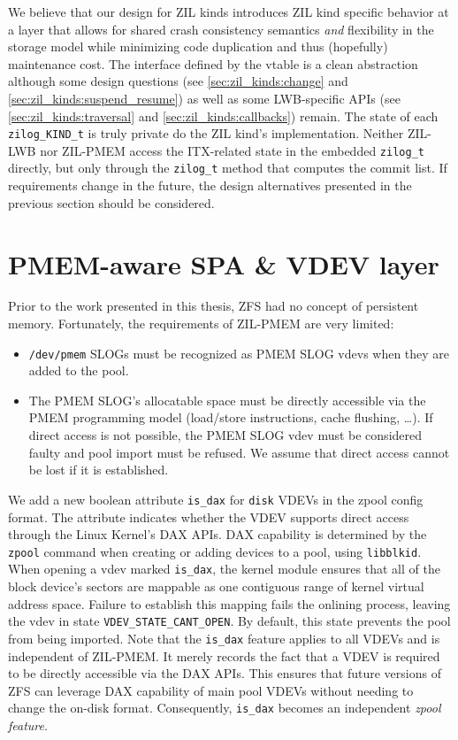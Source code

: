 \documentclass[12pt,a4paper,twoside]{book}
\begin{document}
We believe that our design for ZIL kinds introduces ZIL kind specific behavior at a layer that allows for shared crash consistency semantics \textit{and} flexibility in the storage model while minimizing code duplication and thus (hopefully) maintenance cost.
The interface defined by the vtable is a clean abstraction although some design questions (see \ref{sec:zil_kinds:change} and \ref{sec:zil_kinds:suspend_resume}) as well as some LWB-specific APIs (see \ref{sec:zil_kinds:traversal} and \ref{sec:zil_kinds:callbacks}) remain.
The state of each \lstinline{zilog_KIND_t} is truly private do the ZIL kind's implementation.
Neither ZIL-LWB nor ZIL-PMEM access the ITX-related state in the embedded \lstinline{zilog_t} directly, but only through the \lstinline{zilog_t} method that computes the commit list.
If requirements change in the future, the design alternatives presented in the previous section should be considered.

\section{PMEM-aware SPA \& VDEV layer}\label{sec:pmemspavdev}
Prior to the work presented in this thesis, ZFS had no concept of persistent memory.
Fortunately, the requirements of ZIL-PMEM are very limited:
\begin{itemize}[noitemsep]
    \item \texttt{/dev/pmem} SLOGs must be recognized as PMEM SLOG vdevs when they are added to the pool.
    \item The PMEM SLOG's allocatable space must be directly accessible via the PMEM programming model (load/store instructions, cache flushing, \dots).
        If direct access is not possible, the PMEM SLOG vdev must be considered faulty and pool import must be refused.
        We assume that direct access cannot be lost if it is established.
\end{itemize}

We add a new boolean attribute \lstinline{is_dax} for \lstinline{disk} VDEVs in the zpool config format.
The attribute indicates whether the VDEV supports direct access through the Linux Kernel's DAX APIs.
DAX capability is determined by the \lstinline{zpool} command when creating or adding devices to a pool, using \lstinline{libblkid}.
When opening a vdev marked \lstinline{is_dax}, the kernel module ensures that all of the block device's sectors are mappable as one contiguous range of kernel virtual address space.
Failure to establish this mapping fails the onlining process, leaving the vdev in state \lstinline{VDEV_STATE_CANT_OPEN}.
By default, this state prevents the pool from being imported.
Note that the \lstinline{is_dax} feature applies to all VDEVs and is independent of ZIL-PMEM.
It merely records the fact that a VDEV is required to be directly accessible via the DAX APIs.
This ensures that future versions of ZFS can leverage DAX capability of main pool VDEVs without needing to change the on-disk format.
Consequently, \lstinline{is_dax} becomes an independent \textit{zpool feature}.
\end{document}
